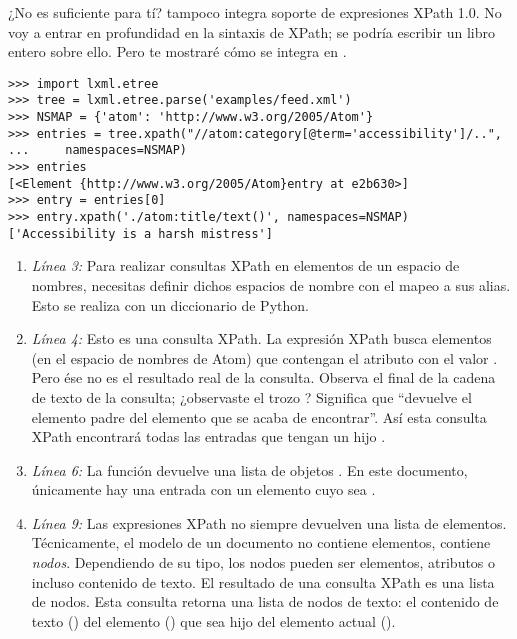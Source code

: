 ¿No es suficiente para tí?  tampoco integra soporte de expresiones XPath 1.0. No voy a entrar en profundidad en la sintaxis de XPath; se podría escribir un libro entero sobre ello. Pero te mostraré cómo se integra en .

\noindent\begin{minipage}{\textwidth}
\begin{lstlisting}[mathescape=True]
>>> import lxml.etree
>>> tree = lxml.etree.parse('examples/feed.xml')
>>> NSMAP = {'atom': 'http://www.w3.org/2005/Atom'}
>>> entries = tree.xpath("//atom:category[@term='accessibility']/..",
...     namespaces=NSMAP)
>>> entries 
[<Element {http://www.w3.org/2005/Atom}entry at e2b630>]
>>> entry = entries[0]
>>> entry.xpath('./atom:title/text()', namespaces=NSMAP)
['Accessibility is a harsh mistress']
\end{lstlisting}
\end{minipage}

\begin{enumerate}

\item \emph{Línea 3:} Para realizar consultas XPath en elementos de un espacio de nombres, necesitas definir dichos espacios de nombre con el mapeo a sus alias. Esto se realiza con un diccionario de Python.

\item \emph{Línea 4:} Esto es una consulta XPath. La expresión XPath busca elementos  (en el espacio de nombres de Atom) que contengan el atributo  con el valor . Pero ése no es el resultado real de la consulta. Observa el final de la cadena de texto de la consulta; ¿observaste el trozo ? Significa que ``devuelve el elemento padre del elemento  que se acaba de encontrar''. Así esta consulta XPath encontrará todas las entradas que tengan un hijo .

\item \emph{Línea 6:} La función  devuelve una lista de objetos . En este documento, únicamente hay una entrada con un elemento  cuyo  sea .

\item \emph{Línea 9:} Las expresiones XPath no siempre devuelven una lista de elementos. Técnicamente, el modelo  de un documento  no contiene elementos, contiene \emph{nodos}. Dependiendo de su tipo, los nodos pueden ser elementos, atributos o incluso contenido de texto. El resultado de una consulta XPath es una lista de nodos. Esta consulta retorna una lista de nodos de texto: el contenido de texto () del elemento  () que sea hijo del elemento actual ().

\end{enumerate}


